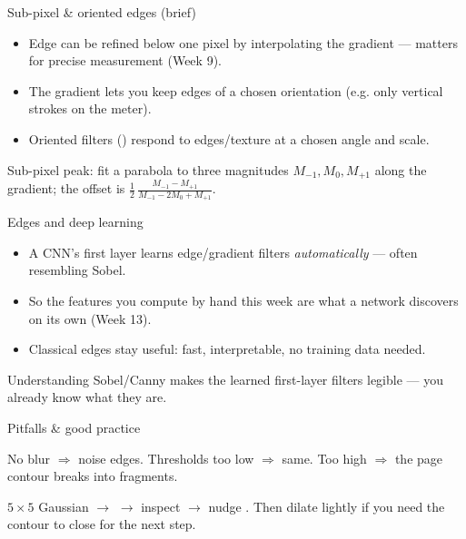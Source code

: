 \documentclass[10pt,aspectratio=169]{beamer}
\begin{document}
\begin{frame}{Sub-pixel \& oriented edges (brief)}
  \begin{itemize}
    \item Edge  can be refined below one pixel by interpolating the gradient —
          matters for precise measurement (Week 9).
    \item The gradient  lets you keep edges of a chosen orientation (e.g. only vertical strokes on the meter).
    \item Oriented filters () respond to edges/texture at a chosen angle and scale.
  \end{itemize}
  \begin{mathbox}
    Sub-pixel peak: fit a parabola to three magnitudes $M_{-1},M_0,M_{+1}$ along the gradient;
    the offset is $\tfrac{1}{2}\,\frac{M_{-1}-M_{+1}}{M_{-1}-2M_0+M_{+1}}$.
  \end{mathbox}
\end{frame}

\begin{frame}{Edges and deep learning}
  \begin{itemize}
    \item A CNN's first layer learns edge/gradient filters \emph{automatically} — often resembling Sobel.
    \item So the features you compute by hand this week are what a network discovers on its own (Week 13).
    \item Classical edges stay useful: fast, interpretable, no training data needed.
  \end{itemize}
  \begin{infobox}
    Understanding Sobel/Canny makes the learned first-layer filters legible — you already know what they are.
  \end{infobox}
\end{frame}

\begin{frame}{Pitfalls \& good practice}
  \begin{badbox}
    No blur $\Rightarrow$ noise edges. Thresholds too low $\Rightarrow$ same. Too high $\Rightarrow$
    the page contour breaks into fragments.
  \end{badbox}
  \begin{goodbox}
    $5{\times}5$ Gaussian $\to$  $\to$ inspect $\to$ nudge . Then dilate
    lightly if you need the contour to close for the next step.
  \end{goodbox}
\end{frame}
\end{document}
